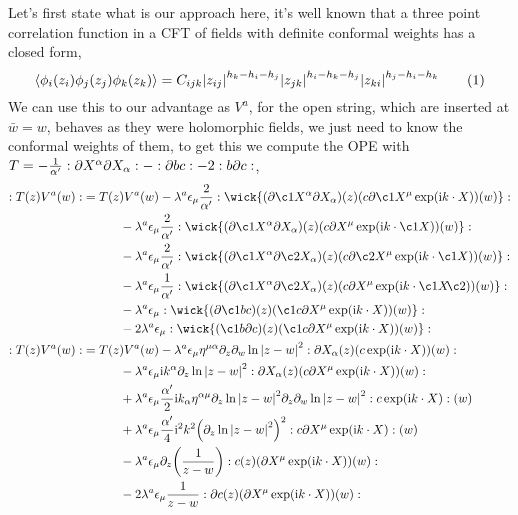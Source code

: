 Let's first state what is our approach here, it's well known that a three point correlation function in a CFT of 
fields with definite conformal weights has a closed form,
\[\expval{\phi_i\qty(z_i)\phi_j\qty(z_j)\phi_k\qty(z_k)}=C_{ijk}\abs{z_{ij}}^{h_k-h_i-h_j}\abs{z_{jk}}^{h_i-h_k-h_j}\abs{z_{ki}}^{h_j-h_i-h_k}\numberthis\label{threepointcft}\]
We can use this to our advantage as $V^a$, for the open string, which are inserted at $\bar w=w$, behaves as they were holomorphic fields, 
we just need to know the conformal weights of them, to get this we compute the OPE with $T=-\frac{1}{\alpha'}:\partial X^\alpha\partial X_\alpha:-:\partial b c:-2:b\partial c:$, 
\begin{align*}
    \cnord{T\qty(z) V^a\qty(w)}&=T\qty(z) V^a\qty(w)-\lambda^a\epsilon_\mu\frac{2}{\alpha'}\cnord{\wick{(\partial\c1 X^\alpha\partial X_\alpha)(z)(c\partial\c1 X^\mu\exp(\im k\cdot X))(w)}}\\
    &\quad\quad\quad-\lambda^a\epsilon_\mu\frac{2}{\alpha'}\cnord{\wick{(\partial\c1 X^\alpha\partial X_\alpha)(z)(c\partial X^\mu\exp(\im k\cdot \c1X))(w)}}\\
    &\quad\quad\quad-\lambda^a\epsilon_\mu\frac{2}{\alpha'}\cnord{\wick{(\partial\c1 X^\alpha\partial\c2 X_\alpha)(z)(c\partial\c2 X^\mu\exp(\im k\cdot \c1X))(w)}}\\
    &\quad\quad\quad-\lambda^a\epsilon_\mu\frac{1}{\alpha'}\cnord{\wick{(\partial\c1 X^\alpha\partial\c2 X_\alpha)(z)(c\partial X^\mu\exp(\im k\cdot \c1X\mkern-4mu \c2 {\mathclap{\phantom{X}}}))(w)}}\\
    &\quad\quad\quad-\lambda^a\epsilon_\mu\cnord{\wick{(\partial \c1 bc)(z)(\c1c\partial X^\mu\exp(\im k\cdot X))(w)}}\\
    &\quad\quad\quad-2\lambda^a\epsilon_\mu\cnord{\wick{(  \c1b\partial c)(z)(\c1c\partial X^\mu\exp(\im k\cdot X))(w)}}\\
    \cnord{T\qty(z) V^a\qty(w)}&=T\qty(z) V^a\qty(w)-\lambda^a\epsilon_\mu\eta^{\mu\alpha}\partial_z\partial_w\ln\abs{z-w}^2\cnord{{\partial X_\alpha(z)(c\exp(\im k\cdot X))(w)}}\\
    &\quad\quad\quad-\lambda^a\epsilon_\mu\im k^\alpha\partial_z\ln\abs{z-w}^2\cnord{{\partial X_\alpha(z)(c\partial X^\mu\exp(\im k\cdot X))(w)}}\\
    &\quad\quad\quad+\lambda^a\epsilon_\mu\frac{\alpha'}{2}\im k_\alpha\eta^{\alpha\mu}\partial_z\ln\abs{z-w}^2\partial_z\partial_w\ln\abs{z-w}^2\cnord{c\exp(\im k\cdot X)}(w)\\
    &\quad\quad\quad+\lambda^a\epsilon_\mu\frac{\alpha'}{4}\im^2 k^2\qty(\partial_z\ln\abs{z-w}^2)^2\cnord{c\partial X^\mu\exp(\im k\cdot X)}(w)\\
    &\quad\quad\quad-\lambda^a\epsilon_\mu\partial_z\qty(\frac{1}{z-w})\cnord{c(z)(\partial X^\mu\exp(\im k\cdot X))(w)}\\
    &\quad\quad\quad-2\lambda^a\epsilon_\mu\frac{1}{z-w}\cnord{\partial c(z)(\partial X^\mu\exp(\im k\cdot X))(w)}
\end{align*}
